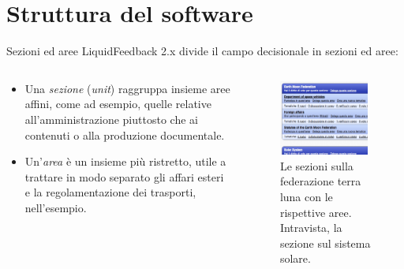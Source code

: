 \section{Struttura del software}
\begin{frame}{Sezioni ed aree}
LiquidFeedback 2.x divide il campo decisionale in sezioni ed aree: 
\begin{columns}
\begin{column}{0.5\textwidth}
\begin{itemize}
\item Una \emph{sezione} (\emph{unit}) raggruppa insieme aree affini, come ad esempio, quelle relative all'amministrazione piuttosto che ai contenuti o alla produzione documentale.
\item Un'\emph{area} è un insieme più ristretto, utile a trattare in modo separato gli affari esteri e la regolamentazione dei trasporti, nell'esempio.
\end{itemize}
\end{column}
\begin{column}{0.5\textwidth}
\begin{figure}
\includegraphics[width=0.95\textwidth]{pics/unitarea}
\caption{Le sezioni sulla federazione terra luna con le rispettive aree. Intravista, la sezione sul sistema solare.}
\end{figure}
\end{column}
\end{columns}
\end{frame}

